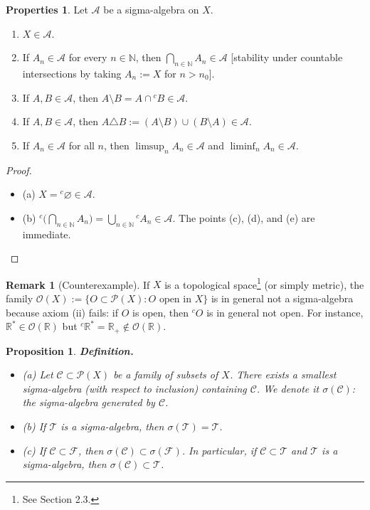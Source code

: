 \documentclass[12pt]{article}
\newtheorem{proposition}{Proposition}[section]
\theoremstyle{definition}
\newtheorem{remark}{Remark}[section]
\newtheorem{properties}{Properties}[section]
\begin{document}
\begin{properties}
Let $\mathcal A$ be a sigma-algebra on $X$.
\begin{enumerate}[label=(\alph*),leftmargin=2em]
\item $X\in\mathcal A$.
\item If $A_n\in\mathcal A$ for every $n\in\mathbb N$, then $\displaystyle \bigcap_{n\in\mathbb N} A_n\in\mathcal A$ \hfill[stability under countable intersections by taking $A_n:=X$ for $n>n_0$].
\item If $A,B\in\mathcal A$, then $A\setminus B=A\cap{}^{c}\!B\in\mathcal A$.
\item If $A,B\in\mathcal A$, then $A\triangle B:=(A\setminus B)\cup(B\setminus A)\in\mathcal A$.
\item If $A_n\in\mathcal A$ for all $n$, then $\limsup_{n} A_n\in\mathcal A$ and $\liminf_{n} A_n\in\mathcal A$.
\end{enumerate}
	
\end{properties}

\begin{proof}
\begin{itemize}
\item (a) $X={}^c\!\varnothing\in\mathcal A$. \quad
\item (b) ${}^{c}\!\bigl(\bigcap_{n\in\mathbb N}A_n\bigr)=\bigcup_{n\in\mathbb N} {}^{c}\!A_n\in\mathcal A$.
The points (c), (d), and (e) are immediate.
\end{itemize}
\end{proof}

\medskip\noindent
\begin{remark} [Counterexample]
If $X$ is a topological space\footnote{See Section 2.3.} (or simply metric), the family $\mathcal O(X):=\{O\subset\mathcal P(X): O \text{ open in }X\}$ is in general not a sigma-algebra because axiom (ii) fails: if $O$ is open, then ${}^{c}\!O$ is in general not open. For instance, $\mathbb R^\ast\in\mathcal O(\mathbb R)$ but ${}^{c}\!\mathbb R^\ast=\mathbb R_+\notin\mathcal O(\mathbb R)$.
\end{remark}

\begin{proposition}\label{prop:gen}
\textbf{Definition.}\quad
\begin{itemize}
\item (a) Let $\mathscr C\subset\mathcal P(X)$ be a family of subsets of $X$. There exists a smallest sigma-algebra (with respect to inclusion) containing $\mathscr C$. We denote it $\sigma(\mathscr C)$: the sigma-algebra generated by $\mathscr C$.

\item (b) If $\mathcal T$ is a sigma-algebra, then $\sigma(\mathcal T)=\mathcal T$.

\item (c) If $\mathscr C\subset\mathscr F$, then $\sigma(\mathscr C)\subset \sigma(\mathscr F)$. In particular, if $\mathscr C\subset \mathcal T$ and $\mathcal T$ is a sigma-algebra, then $\sigma(\mathscr C)\subset\mathcal T$.
\end{itemize}
\end{proposition}
\end{document}
